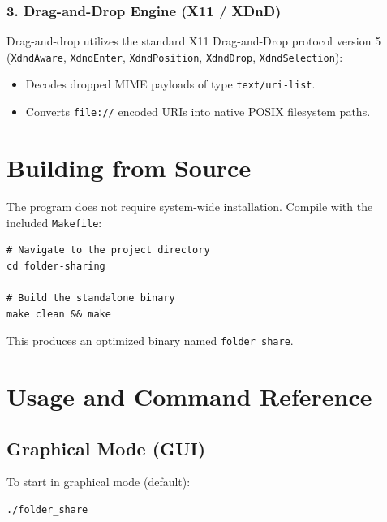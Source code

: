 \documentclass[11pt,a4paper]{article}
\begin{document}
\subsubsection{3. Drag-and-Drop Engine (X11 / XDnD)}
Drag-and-drop utilizes the standard X11 Drag-and-Drop protocol version 5 (\texttt{XdndAware}, \texttt{XdndEnter}, \texttt{XdndPosition}, \texttt{XdndDrop}, \texttt{XdndSelection}):
\begin{itemize}
    \item Decodes dropped MIME payloads of type \texttt{text/uri-list}.
    \item Converts \texttt{file://} encoded URIs into native POSIX filesystem paths.
\end{itemize}

\section{Building from Source}

The program does not require system-wide installation. Compile with the included \texttt{Makefile}:

\begin{lstlisting}[style=bashblock]
# Navigate to the project directory
cd folder-sharing

# Build the standalone binary
make clean && make
\end{lstlisting}

This produces an optimized binary named \texttt{folder\_share}.

\section{Usage and Command Reference}

\subsection{Graphical Mode (GUI)}
To start in graphical mode (default):
\begin{lstlisting}[style=bashblock]
./folder_share
\end{lstlisting}
\end{document}
